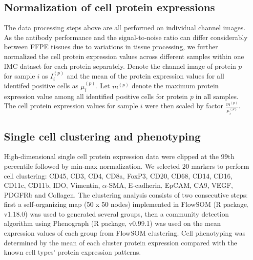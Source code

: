\documentclass{mynature}
\begin{document}
\subsection{Normalization of cell protein expressions}

The data processing steps above are all performed on individual channel images. 
As the antibody performance and the signal-to-noise ratio can differ considerably between FFPE tissues due to variations in tissue processing, we further normalized the cell protein expression values across different samples within one IMC dataset for each protein separately. 
Denote the channel image of protein $p$ for sample $i$ as $I_i^{(p)}$ and the mean of the protein expression values for all identifed positive cells as $\mu_i^{(p)}$. 
Let $m^{(p)}$ denote the maximum protein expression value among all identified positive cells for protein $p$ in all samples. 
The cell protein expression values for sample $i$ were then scaled by factor $\frac{m^{(p)}}{\mu_i^{(p)}}$. 


\subsection{Single cell clustering and phenotyping}
High-dimensional single cell protein expression data were clipped at the 99th percentile followed by min-max normalization. 
We selected 20 markers to perform cell clustering: CD45, CD3, CD4, CD8a, FoxP3, CD20, CD68, CD14, CD16, CD11c, CD11b, IDO, Vimentin, $\alpha$-SMA, E-cadherin, EpCAM, CA9, VEGF, PDGFRb and Collagen. 
The clustering analysis consists of two consecutive steps: 
first a self-organizing map (50 x 50 nodes) implemented in FlowSOM (R package, v1.18.0) was used to generated several groups, then a community detection algorithm using Phenograph (R package, v0.99.1) was used on the mean expression values of each group from FlowSOM clustering. 
Cell phenotyping was determined by the mean of each cluster protein expression compared with the known cell types' protein expression patterns. 
\end{document}
